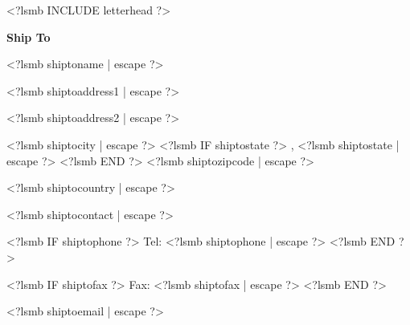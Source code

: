 \documentclass{scrartcl}
\begin{document}
\pagestyle{myheadings}
\thispagestyle{empty}

\fontsize{10pt}{12pt}\selectfont

\newsavebox{\ftr}

<?lsmb INCLUDE letterhead ?>

%
%
%


\vspace*{0.5cm}

\parbox[t]{.5\textwidth}{
\textbf{Ship To}} \hfill

\vspace{0.3cm}

\parbox[t]{.5\textwidth}{

<?lsmb shiptoname | escape ?>

<?lsmb shiptoaddress1 | escape ?>

<?lsmb shiptoaddress2 | escape ?>

<?lsmb shiptocity | escape ?>
<?lsmb IF shiptostate ?>
\hspace{-0.1cm}, <?lsmb shiptostate | escape ?>
<?lsmb END ?>
<?lsmb shiptozipcode | escape ?>

<?lsmb shiptocountry | escape ?>
}
\parbox[t]{.5\textwidth}{
  <?lsmb shiptocontact | escape ?>

  <?lsmb IF shiptophone ?>
  Tel: <?lsmb shiptophone | escape ?>
  <?lsmb END ?>

  <?lsmb IF shiptofax ?>
  Fax: <?lsmb shiptofax | escape ?>
  <?lsmb END ?>

  <?lsmb shiptoemail | escape ?>
}
\hfill

\vspace{1cm}
\end{document}
